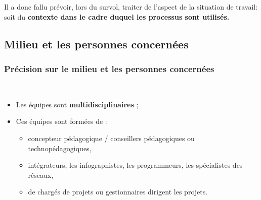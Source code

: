 \begin{frame}[allowframebreaks]
			\par  Il a donc fallu prévoir, lors du survol, traiter de l’aspect de la situation de travail: soit du \textbf{contexte dans le cadre duquel les processus sont utilisés.}
                \end{frame}

\subsection{Milieu et les personnes concernées} 
		\begin{frame}[allowframebreaks]
			\frametitle{Précision sur le milieu et les personnes concernées}
                        \
                        \begin{itemize} 
                        \item  Les équipes sont \textbf{multidisciplinaires} ;
                        \item Ces équipes sont formées de : 
                        	\begin{itemize}
                        		\item concepteur pédagogique / conseillers pédagogiques ou technopédagogiques,
                        		\item intégrateurs, les infographistes, les programmeurs, les spécialistes des réseaux,
                        		\item de chargés de projets ou gestionnaires dirigent les projets.
                        	\end{itemize}

                        \end{itemize}

             
                \end{frame}

